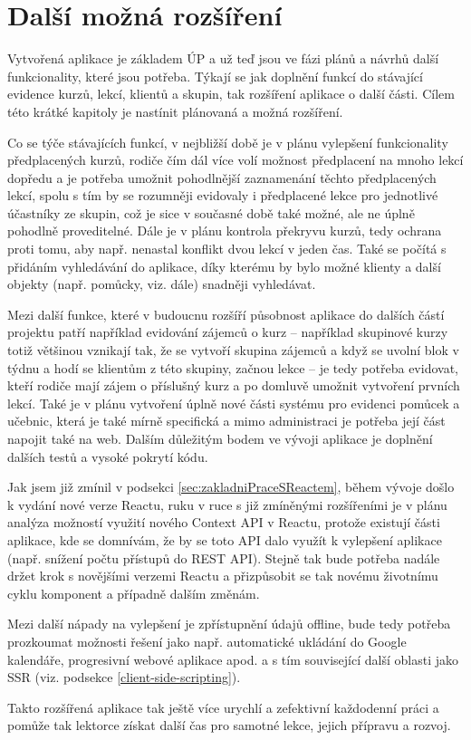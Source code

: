 \chapter{Další možná rozšíření}\label{dalsirozsireni}
Vytvořená aplikace je základem ÚP a už teď jsou ve fázi plánů a návrhů další funkcionality, které jsou potřeba. Týkají se jak doplnění funkcí do stávající evidence kurzů, lekcí, klientů a skupin, tak rozšíření aplikace o další části. Cílem této krátké kapitoly je nastínit plánovaná a možná rozšíření.

Co se týče stávajících funkcí, v nejbližší době je v plánu vylepšení funkcionality předplacených kurzů, rodiče čím dál více volí možnost předplacení na mnoho lekcí dopředu a je potřeba umožnit pohodlnější zaznamenání těchto předplacených lekcí, spolu s tím by se rozumněji evidovaly i předplacené lekce pro jednotlivé účastníky ze skupin, což je sice v současné době také možné, ale ne úplně pohodlně proveditelné. Dále je v plánu kontrola překryvu kurzů, tedy ochrana proti tomu, aby např. nenastal konflikt dvou lekcí v jeden čas. Také se počítá s přidáním vyhledávání do aplikace, díky kterému by bylo možné klienty a další objekty (např. pomůcky, viz. dále) snadněji vyhledávat.

Mezi další funkce, které v budoucnu rozšíří působnost aplikace do dalších částí projektu patří například evidování zájemců o kurz -- například skupinové kurzy totiž většinou vznikají tak, že se vytvoří skupina zájemců a když se uvolní blok v týdnu a hodí se klientům z této skupiny, začnou lekce -- je tedy potřeba evidovat, kteří rodiče mají zájem o příslušný kurz a po domluvě umožnit vytvoření prvních lekcí. Také je v plánu vytvoření úplně nové části systému pro evidenci pomůcek a učebnic, která je také mírně specifická a mimo administraci je potřeba její část napojit také na web. Dalším důležitým bodem ve vývoji aplikace je doplnění dalších testů a vysoké pokrytí kódu.

Jak jsem již zmínil v podsekci \ref{sec:zakladniPraceSReactem}, během vývoje došlo k vydání nové verze Reactu, ruku v ruce s již zmíněnými rozšířeními je v plánu analýza možností využití nového Context API v Reactu, protože existují části aplikace, kde se domnívám, že by se toto API dalo využít k vylepšení aplikace (např. snížení počtu přístupů do REST API). Stejně tak bude potřeba nadále držet krok s novějšími verzemi Reactu a přizpůsobit se tak novému životnímu cyklu komponent a případně dalším změnám.

Mezi další nápady na vylepšení je zpřístupnění údajů offline, bude tedy potřeba prozkoumat možnosti řešení jako např. automatické ukládání do Google kalendáře, progresivní webové aplikace apod. a s tím související další oblasti jako SSR (viz. podsekce \ref{client-side-scripting}).

Takto rozšířená aplikace tak ještě více urychlí a zefektivní každodenní práci a pomůže tak lektorce získat další čas pro samotné lekce, jejich přípravu a rozvoj.
